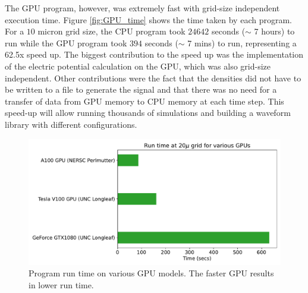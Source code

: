 The GPU program, however, was extremely fast with grid-size independent execution time. Figure \ref{fig:GPU_time} shows the time taken by each program. For a $10$ micron grid size, the CPU program took $24642$ seconds ($\sim$ 7 hours) to run while the GPU program took $394$ seconds ($\sim$ 7 mins) to run, representing a 62.5x speed up. The biggest contribution to the speed up was the implementation of the electric potential calculation on the GPU, which was also grid-size independent. Other contributions were the fact that the densities did not have to be written to a file to generate the signal and that there was no need for a transfer of data from GPU memory to CPU memory at each time step. This speed-up will allow running thousands of simulations and building a waveform library with different configurations.

 \begin{figure}[!htb]
    \centering
    \includegraphics[width=0.99\linewidth]{ch4/figs/gpu_comp.pdf}
\caption{\label{ch4:fig:GPU_comp} Program run time on various GPU models. The faster GPU results in lower run time.}
\end{figure}

